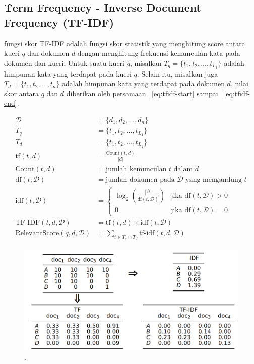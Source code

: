     \subsection{\f{Term Frequency - Inverse Document Frequency} (TF-IDF)}
    \label{sec:tfidf}
 
    fungsi skor TF-IDF adalah fungsi skor statistik yang menghitung $\text{score}$ antara kueri $q$ dan dokumen $d$ dengan menghitung frekuensi kemunculan kata pada dokumen dan kueri. Untuk suatu kueri $q$, misalkan $T_q= \{t_1, t_2, \dots, t_{L_1}\}$ adalah himpunan kata yang terdapat pada kueri $q$. Selain itu, misalkan juga $T_d = \{t_1, t_2, \dots, t_n\}$ adalah himpunan kata yang terdapat pada dokumen $d$. nilai skor antara $q$ dan $d$ diberikan oleh persamaan \equ~\ref{eq:tfidf-start} sampai \equ~\ref{eq:tfidf-end}.
    
    \begin{align}
        \label{eq:tfidf-start}
        \mathcal{D} &= \{d_1, d_2, \dots, d_n\} \\
        T_q &= \{t_1, t_2, \dots, t_{L_1}\} \\
        T_d &= \{t_1, t_2, \dots, t_{L_2}\} \\
        \text{tf}(t, d) &= \frac{\text{Count}(t, d)}{|d|} \\
        \text{Count}(t, d) &= \text{jumlah kemunculan } t \text{ dalam } d \\
        \text{df}(t, \mathcal{D}) &= \text{jumlah dokumen pada } \mathcal{D} \text{ yang mengandung } t \\
        \text{idf}(t, \mathcal{D}) &= \begin{cases}
            \log_2\left(\frac{|\mathcal{D}|}{\text{df}(t, \mathcal{D})}\right) & \text{jika } \text{df}(t, \mathcal{D}) > 0 \\
            0 & \text{jika } \text{df}(t, \mathcal{D}) = 0
        \end{cases} \\
        \label{eq:tf-idf-weight}
        \text{TF-IDF}(t, d, \mathcal{D}) &= \text{tf}(t, d) \times \text{idf}(t, \mathcal{D}) \\
        \label{eq:tfidf-end}
        \text{RelevantScore}(q,d,\mathcal{D}) &= \sum_{t \in T_q \cap T_d} \text{tf-idf}(t, d, \mathcal{D})
    \end{align}

    \begin{figure}
        \centering
        \includegraphics[width=1\textwidth]{assets/pics/tf-idf-matriks.png}
        \caption{\license.}
        \label{fig:tf-idf-matriks}
    \end{figure}
    
